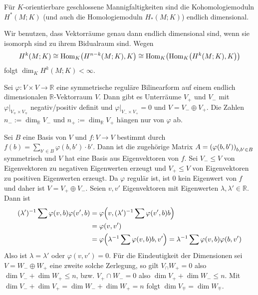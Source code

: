 \begin{korollar}[{name=[Kohomologiemoduln über $K$ sind endlichdimensional]}]
	Für $K$-orientierbare geschlossene Mannigfaltigkeiten sind die Kohomologiemoduln $H^*(M;K)$ (und auch die Homologiemoduln $H_*(M;K)$) endlich dimensional.
\end{korollar}
\begin{beweis}
	Wir benutzen, dass Vektorräume genau dann endlich dimensional sind, wenn sie isomorph sind zu ihrem Bidualraum sind.
	Wegen 
	\[
		H^k(M;K) \cong \Hom_K \enbrace*{H^{n-k}(M;K),K} \cong \Hom_K \enbrace*{\Hom_K \enbrace*{H^k(M;K),K}} 
	\]
	folgt $\dim_K H^k(M;K) < \infty$.
\end{beweis}

\begin{lemma}
	Sei $\varphi \colon V \times V \to \mathbb{R}$ eine symmetrische reguläre Bilinearform auf einem endlich dimensionalen $\mathbb{R}$-Vektorraum $V$.
	Dann gibt es Unterräume $V_+$ und $V_-$ mit $\varphi|_{V_\mp \times V_\mp}$ negativ/positiv definit und $\varphi|_{V_- \times V_+}=0$ und $V= V_- \oplus V_+$.
	Die Zahlen $n_- := \dim_\mathbb{R} V_-$ und $n_+ := \dim_\mathbb{R} V_+$ hängen nur von $\varphi$ ab.
\end{lemma}
\begin{beweis}
	Sei $B$ eine Basis von $V$ und $f \colon V \to V$ bestimmt durch $f(b)= \sum_{b' \in B} \varphi(b,b') \cdot b'$.
	Dann ist die zugehörige Matrix $A= \enbrace*{\varphi(b,b')}_{b,b' \in B}$ symmetrisch und $V$ hat eine Basis aus Eigenvektoren von $f$.
	Sei $V_- \le V$ von Eigenvektoren zu negativen Eigenwerten erzeugt und $V_+ \le V$ von Eigenvektoren zu positiven Eigenwerten erzeugt.
	Da $\varphi$ regulär ist, ist $0$ kein Eigenwert von $f$ und daher ist $V= V_+ \oplus V_-$.
	Seien $v,v'$ Eigenvektoren mit Eigenwerten $\lambda,\lambda' \in \mathbb{R}$.
	Dann ist
	\begin{align}
		(\lambda')^{-1} \sum \varphi(v,b) \varphi(v',b)&= \varphi \enbrace*{v, (\lambda')^{-1} \sum \varphi(v',b) b} \\ &= \varphi(v,v')\\
		&= \varphi \enbrace*{\lambda^{-1} \sum \varphi(v,b)b , v'} = \lambda^{-1} \sum \varphi(v,b) \varphi(b,v')
	\end{align}
	Also ist $\lambda=\lambda'$ oder $\varphi(v,v')=0$. 
	Für die Eindeutigkeit der Dimensionen sei $V=W_- \oplus W_+$ eine zweite solche Zerlegung, so gilt $V_ \cap W_+ =0$ also $\dim V_- + \dim W_+ \le n$, bzw. $V_+ \cap W_- =0$ also $\dim V_+ + \dim W_- \le n$.
	Mit $\dim V_- + \dim V_+ = \dim W_- + \dim W_+ = n$ folgt $\dim V_{\mp} = \dim W_{\mp}$.
\end{beweis}

